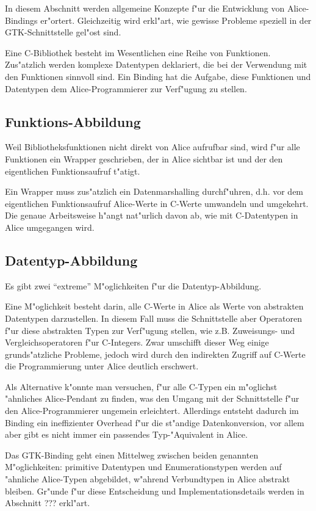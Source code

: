 \documentclass{article}
\begin{document}
In diesem Abschnitt werden allgemeine Konzepte f"ur die Entwicklung von
Alice-Bindings er"ortert. Gleichzeitig wird erkl"art,
wie gewisse Probleme speziell in der GTK-Schnittstelle gel"ost sind.

Eine C-Bibliothek besteht im Wesentlichen eine Reihe von Funktionen.
Zus"atzlich werden komplexe Datentypen deklariert, die bei der Verwendung
mit den Funktionen sinnvoll sind. Ein Binding hat die Aufgabe, diese
Funktionen und Datentypen dem Alice-Programmierer zur Verf"ugung zu stellen.

\subsection*{Funktions-Abbildung}

Weil Bibliotheksfunktionen nicht direkt von Alice aufrufbar sind,
wird f"ur alle Funktionen ein Wrapper geschrieben, der in Alice
sichtbar ist und der den eigentlichen Funktionsaufruf t"atigt.

Ein Wrapper muss zus"atzlich ein Datenmarshalling durchf"uhren, d.h. vor
dem eigentlichen Funktionsaufruf Alice-Werte in C-Werte umwandeln und
umgekehrt. Die genaue Arbeitsweise h"angt nat"urlich davon ab, wie mit
C-Datentypen in Alice umgegangen wird.

\subsection*{Datentyp-Abbildung}

Es gibt zwei ``extreme'' M"oglichkeiten f"ur die Datentyp-Abbildung.

Eine M"oglichkeit besteht darin, alle C-Werte in Alice als Werte von abstrakten
Datentypen darzustellen. In diesem Fall muss die Schnittstelle aber Operatoren
f"ur diese abstrakten Typen zur Verf"ugung stellen, wie z.B. Zuweisungs- und
Vergleichsoperatoren f"ur C-Integers.
Zwar umschifft dieser Weg einige grunds"atzliche Probleme,
jedoch wird durch den indirekten Zugriff auf C-Werte die Programmierung
unter Alice deutlich erschwert.

Als Alternative k"onnte man versuchen, f"ur alle C-Typen ein m"oglichst
"ahnliches Alice-Pendant zu finden, was den Umgang mit der Schnittstelle
f"ur den Alice-Programmierer ungemein erleichtert. Allerdings entsteht
dadurch im Binding ein ineffizienter Overhead f"ur die st"andige
Datenkonversion, vor allem aber gibt es nicht immer
ein passendes Typ-"Aquivalent in Alice.

Das GTK-Binding geht einen Mittelweg zwischen beiden genannten M"oglichkeiten:
primitive Datentypen und Enumerationstypen werden auf "ahnliche Alice-Typen
abgebildet, w"ahrend Verbundtypen in Alice abstrakt bleiben.
Gr"unde f"ur diese Entscheidung und Implementationsdetails werden in Abschnitt
??? erkl"art.
\end{document}
